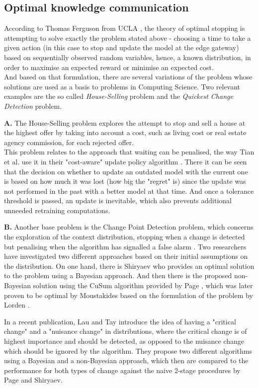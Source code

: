 \documentclass{mpaper}
\begin{document}
\subsection*{Optimal knowledge communication}
According to Thomas Ferguson from UCLA \cite{UCLAbook}, the theory of optimal stopping is attempting to solve exactly the problem stated above - choosing a time to take a given action (in this case to stop and update the model at the edge gateway) based on sequentially observed random variables, hence, a known distribution, in order to maximise an expected reward or minimise an expected cost. \\
And based on that formulation, there are several variations of the problem whose solutions are used as a basis to problems in Computing Science. Two relevant examples are the so called \emph{House-Selling} problem and the \emph{Quickest Change Detection} problem. 

\textbf{A.} The House-Selling problem explores the attempt to stop and sell a house at the highest offer by taking into account a cost, such as living cost or real estate agency commission, for each rejected offer.\\
This problem relates to the approach that waiting can be penalised, the way Tian et al. use it in their "cost-aware" update policy algorithm \cite{tian18}. There it can be seen that the decision on whether to update an outdated model with the current one is based on how much it was lost (how big the "regret" is) since the update was not performed in the past with a better model at that time. And once a tolerance threshold is passed, an update is inevitable, which also prevents additional unneeded retraining computations. 

\textbf{B.} Another base problem is the Change Point Detection problem, which concerns the exploration of the context distribution, stopping when a change is detected but penalising when the algorithm has signalled a false alarm \cite{UCLAbook}. 
Two researchers have investigated two different approaches based on their initial assumptions on the distribution. 
On one hand, there is Shiryaev \cite{shiryaev1963} who provides an optimal solution to the problem using a Bayesian approach. 
And then there is the proposed non-Bayesian solution using the CuSum algorithm provided by Page \cite{page1954}, which was later proven to be optimal by Moustakides \cite{moustakides1986} based on the formulation of the problem by Lorden \cite{lorden1971}.

In a recent publication, Lau and Tay\cite{lautay2018} introduce the idea of having a "critical change" and a "nuisance change" in distributions, where the critical change is of highest importance and should be detected, as opposed to the nuisance change which should be ignored by the algorithm. They propose two different algorithms using a Bayesian and a non-Bayesian approach, which then are compared to the performance for both types of change against the naive 2-stage procedures by Page\cite{page1954} and Shiryaev\cite{shiryaev1963}.
\end{document}
